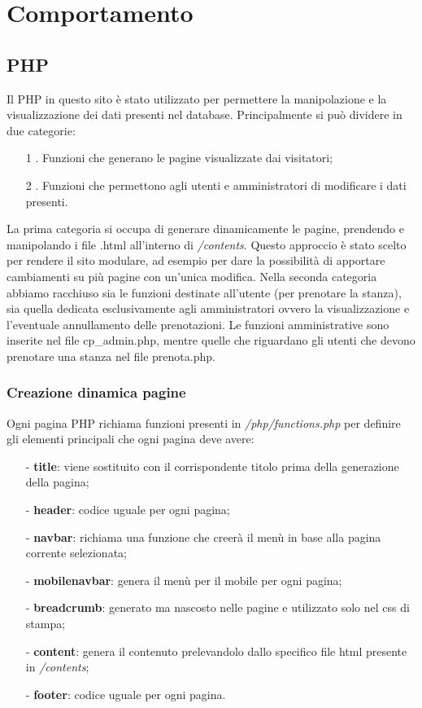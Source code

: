 \section{Comportamento} 
\subsection{PHP}
Il PHP in questo sito è stato utilizzato per permettere la manipolazione e la visualizzazione dei dati presenti nel database. Principalmente si può dividere in due categorie:
\begin{itemize}
	\item [1]. Funzioni che generano le pagine visualizzate dai visitatori;
	\item [2]. Funzioni che permettono agli utenti e amministratori di modificare i dati presenti.
\end{itemize}
La prima categoria si occupa di generare dinamicamente le pagine, prendendo e manipolando i file .html all'interno di \textit{/contents}. Questo approccio è stato scelto per rendere il sito modulare, ad esempio per dare la possibilità di apportare cambiamenti su più pagine con un'unica modifica.
Nella seconda categoria abbiamo racchiuso sia le funzioni destinate all'utente (per prenotare la stanza), sia quella dedicata esclusivamente agli amministratori ovvero la visualizzazione e l'eventuale annullamento delle prenotazioni. Le funzioni amministrative sono inserite nel file cp\_admin.php, mentre quelle che riguardano gli utenti che devono prenotare una stanza nel file prenota.php.
\subsubsection{Creazione dinamica pagine}
Ogni pagina PHP richiama funzioni presenti in \textit{/php/functions.php} per definire gli elementi principali che ogni pagina deve avere:
\begin{itemize}
\item[-] \textbf{title}: viene sostituito con il corrispondente titolo prima della generazione della pagina;
\item[-] \textbf{header}: codice uguale per ogni pagina;
\item[-] \textbf{navbar}: richiama una funzione che creerà il menù in base alla pagina corrente selezionata;
\item[-] \textbf{mobilenavbar}: genera il menù per il mobile per ogni pagina;
\item[-] \textbf{breadcrumb}: generato ma nascosto nelle pagine e utilizzato solo nel css di stampa;
\item[-] \textbf{content}: genera il contenuto prelevandolo dallo specifico file html presente in \textit{/contents};
\item[-] \textbf{footer}: codice uguale per ogni pagina.
\end{itemize}
